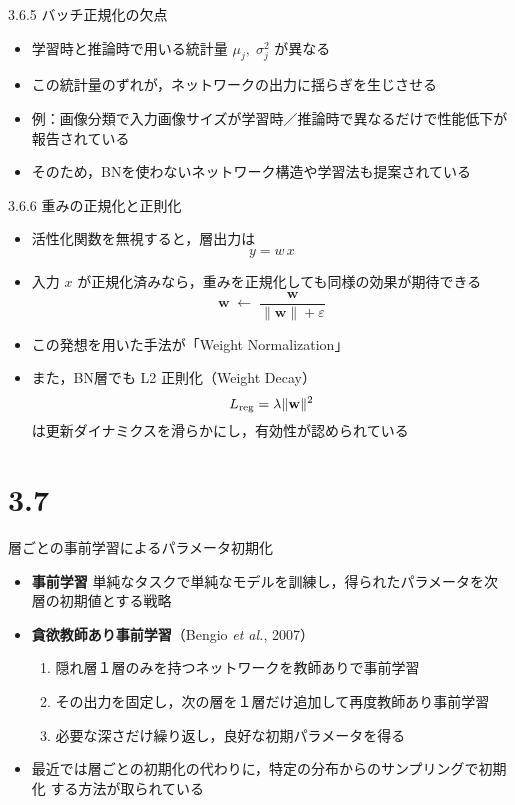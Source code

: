 \documentclass[dvipdfmx,autodetect-engine]{beamer}
\begin{document}
\begin{frame}{3.6.5 バッチ正規化の欠点}
  \begin{itemize}
    \item 学習時と推論時で用いる統計量 $\mu_j,\;\sigma_j^2$ が異なる
    \item この統計量のずれが，ネットワークの出力に揺らぎを生じさせる
    \item 例：画像分類で入力画像サイズが学習時／推論時で異なるだけで性能低下が報告されている    \item そのため，BNを使わないネットワーク構造や学習法も提案されている
  \end{itemize}
\end{frame}

\begin{frame}{3.6.6 重みの正規化と正則化}
  \begin{itemize}
    \item 活性化関数を無視すると，層出力は
      \[
        y = w \, x
      \]
    \item 入力 $x$ が正規化済みなら，重みを正規化しても同様の効果が期待できる
      \[
        \mathbf{w} \;\longleftarrow\; \frac{\mathbf{w}}{\|\mathbf{w}\| + \varepsilon}
      \]
    \item この発想を用いた手法が「Weight Normalization」\cite{77,78,79}
    \item また，BN層でも L2 正則化（Weight Decay）
      \[
        L_{\rm reg} = \lambda \|\mathbf{w}\|^2
      \]
      は更新ダイナミクスを滑らかにし，有効性が認められている\cite{49}
  \end{itemize}
\end{frame}

\section{3.7}

\begin{frame}{層ごとの事前学習によるパラメータ初期化}
  \begin{itemize}
    \item \textbf{事前学習}  
      単純なタスクで単純なモデルを訓練し，得られたパラメータを次層の初期値とする戦略
    \item \textbf{貪欲教師あり事前学習}（Bengio \textit{et al.}, 2007）
      \begin{enumerate}
        \item 隠れ層１層のみを持つネットワークを教師ありで事前学習  
        \item その出力を固定し，次の層を１層だけ追加して再度教師あり事前学習  
        \item 必要な深さだけ繰り返し，良好な初期パラメータを得る
      \end{enumerate}
    \item 最近では層ごとの初期化の代わりに，特定の分布からのサンプリングで初期化
する方法が取られている
    \end{itemize}
\end{frame}
\end{document}
